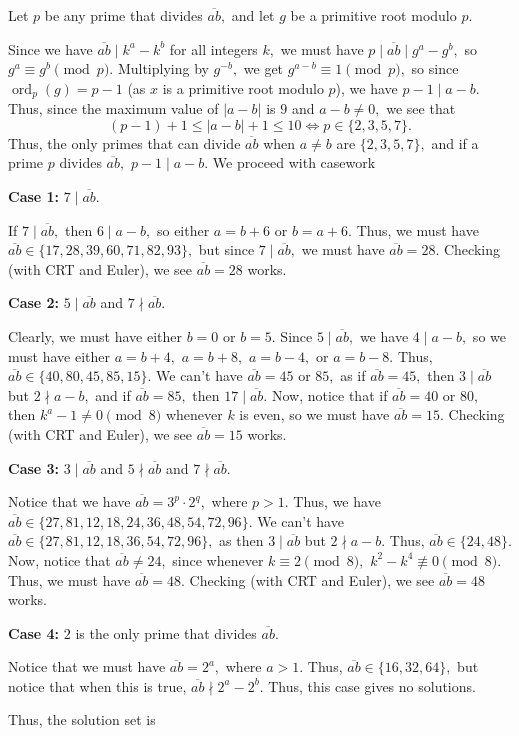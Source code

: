 \documentclass[mast]{lucky}
\begin{document}
\begin{sol}
Let $p$ be any prime that divides $\overline{ab},$ and let $g$ be a primitive root modulo $p.$

Since we have $\overline{ab} \mid k^a-k^b$ for all integers $k,$ we must have $p \mid \overline{ab} \mid g^a - g^b,$ so $g^a \equiv g^b \pmod{p}.$ Multiplying by $g^{-b},$ we get $g^{a-b} \equiv 1 \pmod{p},$ so since $\operatorname{ord}_p(g) = p-1$ (as $x$ is a primitive root modulo $p$), we have $p - 1 \mid a-b.$ Thus, since the maximum value of $|a-b|$ is $9$ and $a - b \neq 0,$ we see that  $$(p - 1)+1 \le |a-b|+1 \le 10 \Longleftrightarrow p \in \{2, 3, 5, 7\}.$$ Thus, the only primes that can divide $\overline{ab}$ when $a \neq b$ are $\{2, 3, 5, 7\},$ and if a prime $p$ divides $\overline{ab},$ $p-1 \mid a-b.$ We proceed with casework

\textbf{Case 1:} $7 \mid \overline{ab}.$

If $7 \mid \overline{ab},$ then $6 \mid a-b,$ so either $a = b+6$ or $b = a+6.$ Thus, we must have $\overline{ab} \in \{17, 28, 39, 60, 71, 82, 93\},$ but since $7 \mid \overline{ab},$ we must have $\overline{ab} = 28.$ Checking (with CRT and Euler), we see $\overline{ab} = 28$ works.

\textbf{Case 2:} $5 \mid \overline{ab}$ and $7 \nmid \overline{ab}.$

Clearly, we must have either $b = 0$ or $b = 5.$ Since $5 \mid \overline{ab},$ we have $4 \mid a-b,$ so we must have either $a = b+4,$ $a = b+8,$ $a = b-4,$ or $a = b-8.$ Thus, $\overline{ab} \in \{40, 80, 45, 85, 15\}.$ We can't have $\overline{ab} = 45$ or $85,$ as if $\overline{ab} = 45,$ then $3 \mid \overline{ab}$ but $2 \nmid a-b,$ and if $\overline{ab} = 85,$ then $17 \mid \overline{ab}.$ Now, notice that if $\overline{ab} = 40$ or $80,$ then $k^a - 1 \neq 0 \pmod{8}$ whenever $k$ is even, so we must have $\overline{ab} = 15.$ Checking (with CRT and Euler), we see $\overline{ab} = 15$ works.

\textbf{Case 3:} $3 \mid \overline{ab}$ and $5 \nmid \overline{ab}$ and $7 \nmid \overline{ab}.$

Notice that we have $\overline{ab} = 3^p \cdot 2^q,$ where $p>1.$ Thus, we have $\overline{ab} \in \{27, 81, 12, 18, 24, 36, 48, 54, 72, 96\}.$ We can't have $\overline{ab} \in \{27, 81, 12, 18, 36, 54, 72, 96\},$ as then $3 \mid \overline{ab}$ but $2 \nmid a-b.$ Thus, $\overline{ab} \in \{24, 48\}.$ Now, notice that $\overline{ab} \neq 24,$ since whenever $k \equiv 2 \pmod{8},$ $k^2 - k^4 \not\equiv 0 \pmod{8}.$ Thus, we must have $\overline{ab} = 48.$
Checking (with CRT and Euler), we see $\overline{ab} = 48$ works.

\textbf{Case 4:} $2$ is the only prime that divides $\overline{ab}.$

Notice that we must have $\overline{ab} = 2^a,$ where $a>1.$ Thus, $\overline{ab} \in \{16, 32, 64\},$ but notice that when this is true, $\overline{ab }\nmid 2^a-2^b.$ Thus, this case gives no solutions.

Thus, the solution set is 

\end{sol}
\end{document}
